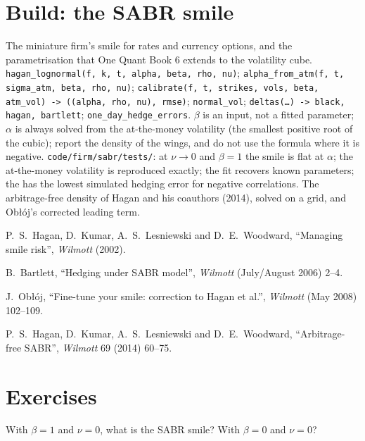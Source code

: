 \section{Build: the SABR smile}\label{bld:dv:sabr-and-smile-dynamics:sabr}

\begin{build}
 The miniature firm's smile for rates and currency options, and the parametrisation that One Quant
Book 6 extends to the volatility cube.
 \texttt{hagan\_lognormal(f, k, t, alpha, beta, rho, nu)}; \texttt{alpha\_from\_atm(f, t,
sigma\_atm, beta, rho, nu)}; \texttt{calibrate(f, t, strikes, vols, beta, atm\_vol) -> ((alpha, rho, nu), rmse)};
\texttt{normal\_vol}; \texttt{deltas(\ldots) -> black, hagan, bartlett}; \texttt{one\_day\_hedge\_errors}.
 $\beta$ is an input, not a fitted parameter; $\alpha$ is always solved from the at-the-money volatility
(the smallest positive root of the cubic); report the density of the wings, and do not use the formula where it is
negative.
 \texttt{code/firm/sabr/tests/}: at $\nu\to0$ and $\beta=1$ the smile is flat at $\alpha$; the
at-the-money volatility is reproduced exactly; the fit recovers known parameters; the  has the
lowest simulated hedging error for negative correlations.
 The arbitrage-free density of Hagan and his coauthors (2014), solved on a grid, and Obłój's corrected
leading term.
\end{build}

\begin{omsources}
\item P.~S.~Hagan, D.~Kumar, A.~S.~Lesniewski and D.~E.~Woodward, ``Managing smile risk'', \emph{Wilmott} (2002).
\item B.~Bartlett, ``Hedging under SABR model'', \emph{Wilmott} (July/August 2006) 2--4.
\item J.~Obłój, ``Fine-tune your smile: correction to Hagan et al.'', \emph{Wilmott} (May 2008) 102--109.
\item P.~S.~Hagan, D.~Kumar, A.~S.~Lesniewski and D.~E.~Woodward, ``Arbitrage-free SABR'', \emph{Wilmott} 69 (2014)
60--75.
\end{omsources}

\section{Exercises}

\begin{exercise}[$\star$]\label{exo:dv:sabr-and-smile-dynamics:1}
With $\beta=1$ and $\nu=0$, what is the SABR smile? With $\beta=0$ and $\nu=0$?
\end{exercise}

